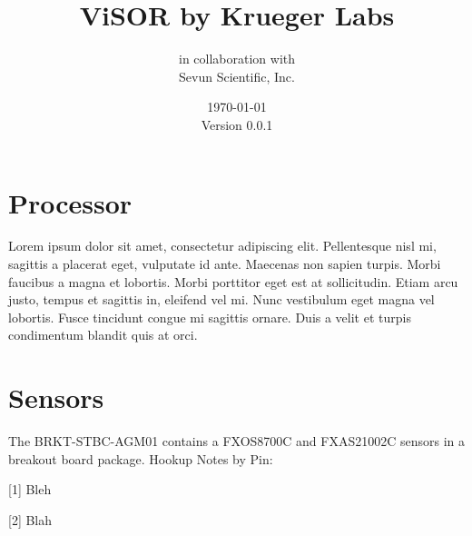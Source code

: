 \documentclass[letterpaper]{report}
\begin{document}
	\title{ViSOR by Krueger Labs}
	\author{in collaboration with \\ Sevun Scientific, Inc.}
	\date{\today \\ Version 0.0.1}
\maketitle


\newpage
\begin{versionhistory}
\end{versionhistory}

\newpage
\tableofcontents

\newpage
\listoffigures

\newpage
\listoftables

\newpage
{}
\setcounter{page}{1}

\chapter{Processor}
Lorem ipsum dolor sit amet, consectetur adipiscing elit. Pellentesque nisl mi, sagittis a placerat eget, vulputate id ante. Maecenas non sapien turpis. Morbi faucibus a magna et lobortis. Morbi porttitor eget est at sollicitudin. Etiam arcu justo, tempus et sagittis in, eleifend vel mi. Nunc vestibulum eget magna vel lobortis. Fusce tincidunt congue mi sagittis ornare. Duis a velit et turpis condimentum blandit quis at orci.

\chapter{Sensors}
The BRKT-STBC-AGM01 contains a FXOS8700C and FXAS21002C sensors in a breakout board package.  Hookup Notes by Pin:

[1] Bleh

[2] Blah
\end{document}

